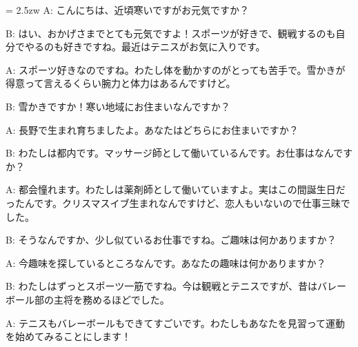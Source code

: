 \documentclass[11pt]{amsart}
\title{}
\author{}
\newenvironment{hangall}[1]{\hangindent = 2.5zw\everypar{\hangindent = 2.5zw}}{}
\begin{document}
\maketitle
\begin{hangall}{}%
A: こんにちは、近頃寒いですがお元気ですか？

B: はい、おかげさまでとても元気ですよ！スポーツが好きで、観戦するのも自分でやるのも好きですね。最近はテニスがお気に入りです。

A: スポーツ好きなのですね。わたし体を動かすのがとっても苦手で。雪かきが得意って言えるくらい腕力と体力はあるんですけど。

B: 雪かきですか！寒い地域にお住まいなんですか？

A: 長野で生まれ育ちましたよ。あなたはどちらにお住まいですか？

B: わたしは都内です。マッサージ師として働いているんです。お仕事はなんですか？

A: 都会憧れます。わたしは薬剤師として働いていますよ。実はこの間誕生日だったんです。クリスマスイブ生まれなんですけど、恋人もいないので仕事三昧でした。

B: そうなんですか、少し似ているお仕事ですね。ご趣味は何かありますか？

A: 今趣味を探しているところなんです。あなたの趣味は何かありますか？

B: わたしはずっとスポーツ一筋ですね。今は観戦とテニスですが、昔はバレーボール部の主将を務めるほどでした。

A: テニスもバレーボールもできてすごいです。わたしもあなたを見習って運動を始めてみることにします！
\end{hangall}
\end{document}
